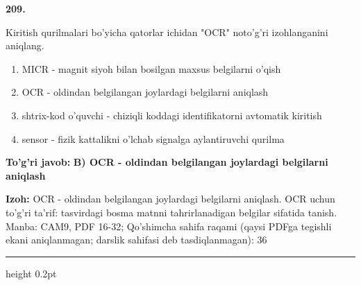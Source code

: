 \documentclass[10pt,a4paper]{article}
\begin{document}
{\bfseries\sffamily\color{ink} 209.}
\par
Kiritish qurilmalari bo'yicha qatorlar ichidan "OCR" noto'g'ri izohlanganini aniqlang.
\begin{enumerate}[label=\Alph*),leftmargin=9mm]
\item MICR - magnit siyoh bilan bosilgan maxsus belgilarni o'qish
\item OCR - oldindan belgilangan joylardagi belgilarni aniqlash
\item shtrix-kod o'quvchi - chiziqli koddagi identifikatorni avtomatik kiritish
\item sensor - fizik kattalikni o'lchab signalga aylantiruvchi qurilma
\end{enumerate}
\begin{tcolorbox}[enhanced,breakable,colback=teal!4,colframe=teal!60!black,boxrule=0.45pt,arc=1.2mm,left=2.7mm,right=2.7mm,top=1.8mm,bottom=1.8mm,before skip=2mm,after skip=2mm]
{\bfseries\sffamily\color{teal}To'g'ri javob:} \textbf{B) OCR - oldindan belgilangan joylardagi belgilarni aniqlash}
\par\smallskip
{\bfseries Izoh:} OCR - oldindan belgilangan joylardagi belgilarni aniqlash. OCR uchun to'g'ri ta'rif: tasvirdagi bosma matnni tahrirlanadigan belgilar sifatida tanish. Manba: CAM9, PDF 16-32; Qo'shimcha sahifa raqami (qaysi PDFga tegishli ekani aniqlanmagan; darslik sahifasi deb tasdiqlanmagan): 36
\end{tcolorbox}
\vspace{2mm}\hrule height 0.2pt\vspace{3mm}
\end{document}
